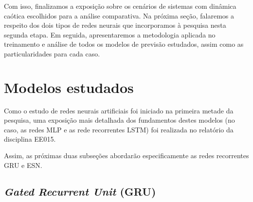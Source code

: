 \documentclass[a4paper, 12pt]{article}
\begin{document}
Com isso, finalizamos a exposição sobre os cenários de sistemas com dinâmica caótica escolhidos para a análise comparativa. Na próxima seção, falaremos a respeito dos dois tipos de redes neurais que incorporamos à pesquisa nesta segunda etapa. Em seguida, apresentaremos a metodologia aplicada no treinamento e análise de todos os modelos de previsão estudados, assim como as particularidades para cada caso.

\section{Modelos estudados}

Como o estudo de redes neurais artificiais foi iniciado na primeira metade da pesquisa, uma exposição mais detalhada dos fundamentos destes modelos (no caso, as redes MLP e as rede recorrentes LSTM) foi realizada no relatório da disciplina EE015.

Assim, as próximas duas subseções abordarão especificamente as redes recorrentes GRU e ESN.

\subsection{\textit{Gated Recurrent Unit} (GRU)}
\end{document}
